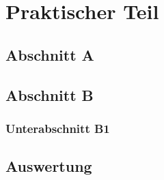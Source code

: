 \chapter{Praktischer Teil}
\label{cap:empirisch}

\section{Abschnitt A}
\label{cap:empirisch:defA}

\section{Abschnitt B}
\label{cap:empirisch:def}

\subsection{Unterabschnitt B1}
\label{cap:empirisch:defC}

\section{Auswertung}
\label{cap:empirisch:ausw}
